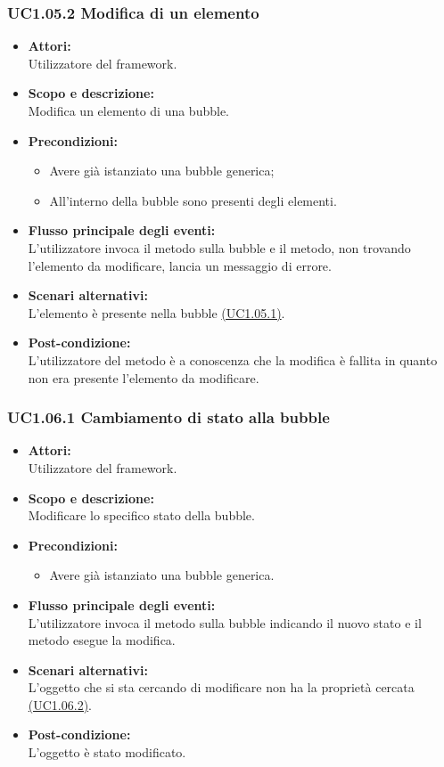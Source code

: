 \subsubsection{UC1.05.2 Modifica di un elemento} \label{UC1.05.2}

\begin{itemize}
	\item \textbf{Attori:}
	\\Utilizzatore del framework.
	\item \textbf{Scopo e descrizione:} 
	\\Modifica un elemento di una bubble.
	\item \textbf{Precondizioni:}
	\begin{itemize}
		\item Avere già istanziato una bubble generica;
		\item All'interno della bubble sono presenti degli elementi.
	\end{itemize}
	\item \textbf{Flusso principale degli eventi:}
	\\L’utilizzatore invoca il metodo sulla bubble e il metodo, non trovando l’elemento da modificare, lancia un messaggio di errore.
	\item \textbf{Scenari alternativi:}
	\\L’elemento è presente nella bubble \hyperref[UC1.05.1]{(UC1.05.1)}.
	\item \textbf{Post-condizione:}
	\\L’utilizzatore del metodo è a conoscenza che la modifica è fallita in quanto non era presente l’elemento da modificare.
\end{itemize}

\subsubsection{UC1.06.1 Cambiamento di stato alla bubble} \label{UC1.06.1}

\begin{itemize}
	\item \textbf{Attori:}
	\\Utilizzatore del framework.
	\item \textbf{Scopo e descrizione:} 
	\\Modificare lo specifico stato della bubble.
	\item \textbf{Precondizioni:}
	\begin{itemize}
		\item Avere già istanziato una bubble generica.
	\end{itemize}
	\item \textbf{Flusso principale degli eventi:}
	\\L’utilizzatore invoca il metodo sulla bubble indicando il nuovo stato e il metodo esegue la modifica.
	\item \textbf{Scenari alternativi:}
	\\L'oggetto che si sta cercando di modificare non ha la proprietà cercata \hyperref[UC1.06.2]{(UC1.06.2)}.
	\item \textbf{Post-condizione:}
	\\L'oggetto è stato modificato.
\end{itemize}

